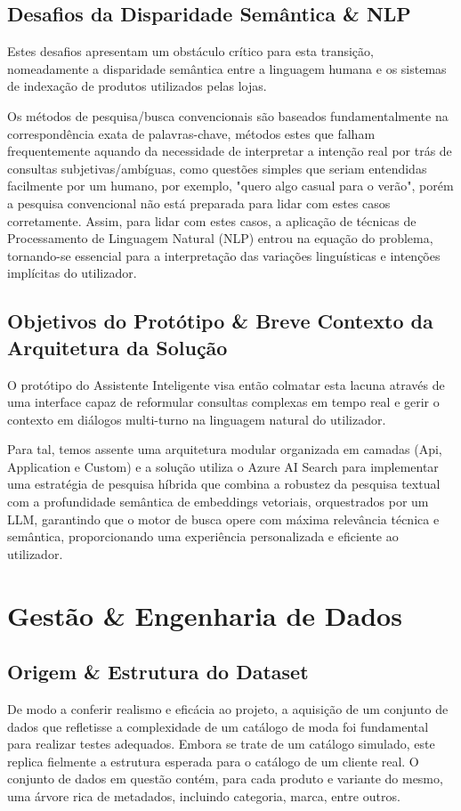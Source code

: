 \documentclass[runningheads]{llncs}
\begin{document}
\subsection*{Desafios da Disparidade Semântica \& NLP}
Estes desafios apresentam um obstáculo crítico para esta transição, nomeadamente a disparidade semântica entre a linguagem humana e os sistemas de indexação de produtos utilizados pelas lojas. 

Os métodos de pesquisa/busca convencionais são baseados fundamentalmente na correspondência exata de palavras-chave, métodos estes que falham frequentemente aquando da necessidade de interpretar a intenção real por trás de consultas subjetivas/ambíguas, como questões simples que seriam entendidas facilmente por um humano, por exemplo, "quero algo casual para o verão", porém a pesquisa convencional não está preparada para lidar com estes casos corretamente. Assim, para lidar com estes casos, a aplicação de técnicas de Processamento de Linguagem Natural (NLP) entrou na equação do problema, tornando-se essencial para a interpretação das variações linguísticas e intenções implícitas do utilizador.

\subsection*{Objetivos do Protótipo \& Breve Contexto da Arquitetura da Solução}
O protótipo do Assistente Inteligente visa então colmatar esta lacuna através de uma interface capaz de reformular consultas complexas em tempo real e gerir o contexto em diálogos multi-turno na linguagem natural do utilizador.

Para tal, temos assente uma arquitetura modular organizada em camadas (Api, Application e Custom) e a solução utiliza o Azure AI Search para implementar uma estratégia de pesquisa híbrida que combina a robustez da pesquisa textual com a profundidade semântica de embeddings vetoriais, orquestrados por um LLM, garantindo que o motor de busca opere com máxima relevância técnica e semântica, proporcionando uma experiência personalizada e eficiente ao utilizador.

\section*{Gestão \& Engenharia de Dados}
\subsection*{Origem \& Estrutura do Dataset}
De modo a conferir realismo e eficácia ao projeto, a aquisição de um conjunto de dados que refletisse a complexidade de um catálogo de moda foi fundamental para realizar testes adequados. Embora se trate de um catálogo simulado, este replica fielmente a estrutura esperada para o catálogo de um cliente real. O conjunto de dados em questão contém, para cada produto e variante do mesmo, uma árvore rica de metadados, incluindo categoria, marca, entre outros.
\end{document}
